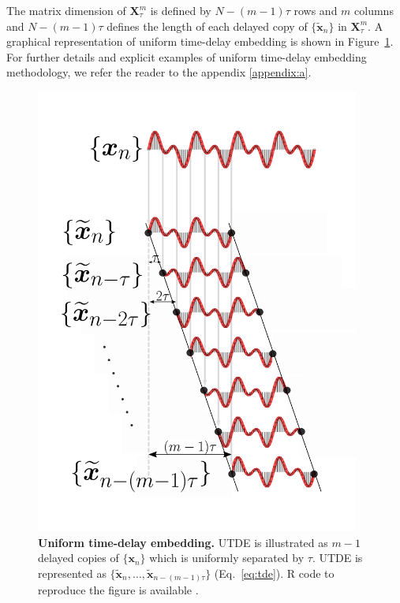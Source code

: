 The matrix dimension of $ \boldsymbol{X}_{\tau}^{m} $ is defined by
$N-(m-1)\tau$ rows and $m$ columns and $N-(m-1)\tau$ defines the length of 
each delayed copy 
of $\{ \boldsymbol{ \tilde{x} }_n \}$ in $\boldsymbol{X}^{m}_{\tau}$.
A graphical representation of uniform time-delay embedding is shown in 
Figure~\ref{fig:utde}. For further details and explicit examples of uniform 
time-delay embedding methodology, we refer the reader to the appendix 
\ref{appendix:a}.
\begin{figure}
 \centering
   \includegraphics[width=0.95\textwidth]{utde}
   \caption{
	{\bf Uniform time-delay embedding.} 
	UTDE is illustrated as $m-1$ delayed copies
   	of $\{ \boldsymbol{x}_n \}$ which is uniformly separated by $\tau$.
	UTDE is represented as
	$\{ \boldsymbol{ \tilde{x} }_n, \dots,  
	\boldsymbol{ \tilde{x} }_{n -(m-1)\tau}   \}$ (Eq.~\ref{eq:tde}).
	R code to reproduce the figure is available \cite{hwum2018}.
   }
   \label{fig:utde}
\end{figure}


